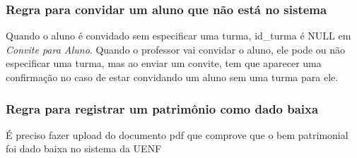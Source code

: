 \subsubsection{Regra para convidar um aluno que não está no sistema}
\begin{regra}
Quando o aluno é convidado sem especificar uma turma, id\_turma é NULL em \textit{Convite para Aluno}. Quando o professor vai convidar o aluno, ele pode ou não especificar uma turma, mas ao enviar um convite, tem que aparecer uma confirmação no caso de estar convidando um aluno sem uma turma para ele.
\end{regra}
\subsubsection{Regra para registrar um patrimônio como dado baixa}
\begin{regra}
É preciso fazer upload do documento pdf que comprove que o bem patrimonial foi dado baixa no sistema da UENF
\end{regra}
